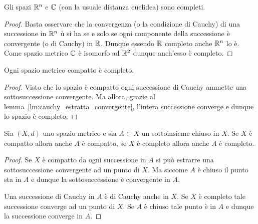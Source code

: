 \begin{corollary}[completezza di $\RR^n$ e $\CC$]
Gli spazi $\RR^n$ e $\CC$ (con la usuale distanza euclidea)
sono completi.
\end{corollary}
%
\begin{proof}
Basta osservare che la convergenza (o la condizione di Cauchy) di una successione in $\RR^n$ ù
si ha se e solo se ogni componente della successione è convergente (o di Cauchy) in ${\mathbb R}$. 
Dunque essendo ${\mathbb R}$ completo anche $\RR^n$ lo è. 
Come spazio metrico $\CC$ è isomorfo ad ${\mathbb R}^2$ dunque anch'esso è completo.
\end{proof}

\begin{theorem}
Ogni spazio metrico compatto è completo.
\end{theorem}
%
\begin{proof}
Visto che lo spazio è compatto ogni successione di Cauchy
ammette una sottosuccessione convergente.
Ma allora, grazie al lemma~\ref{lm:cauchy_estratta_convergente},
l'intera successione converge e dunque lo spazio è completo.
\end{proof}

\begin{theorem}%
\label{th:chiuso_completo}%
\label{th:compatto_completo}%
Sia $(X,d)$ uno spazio metrico e sia $A\subset X$ un sottoinsieme chiuso in $X$. Se $X$ è compatto allora anche $A$ è compatto, se $X$ è completo allora anche $A$ è completo.
\end{theorem}
\begin{proof}
Se $X$ è compatto da ogni successione in $A$ si può estrarre una sottosuccessione convergente ad un punto di $X$. 
Ma siccome $A$ è chiuso il punto sta in $A$ e dunque la sottosuccessione è convergente in $A$.

Una successione di Cauchy in $A$ è di Cauchy anche in $X$. 
Se $X$ è completo tale successione converge ad un punto di $X$. 
Se $A$ è chiuso tale punto è in $A$ e dunque la successione converge in $A$.
\end{proof}

